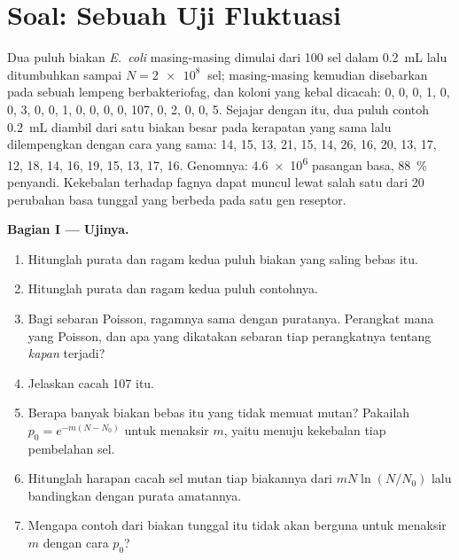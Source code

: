 \section{Soal: Sebuah Uji Fluktuasi}

\begin{problem}
\label{pb:b2:genome-diversification:1}
Dua puluh biakan \emph{E.~coli} masing-masing dimulai dari \num{100}
sel dalam \qty{0.2}{mL} lalu ditumbuhkan sampai $N = \qty{2e8}{}$ sel;
masing-masing kemudian disebarkan pada sebuah lempeng berbakteriofag,
dan koloni yang kebal dicacah: 0, 0, 0, 1, 0, 0, 3, 0, 0, 1, 0, 0, 0,
0, 107, 0, 2, 0, 0, 5. Sejajar dengan itu, dua puluh contoh
\qty{0.2}{mL} diambil dari satu biakan besar pada kerapatan yang sama
lalu dilempengkan dengan cara yang sama: 14, 15, 13, 21, 15, 14, 26,
16, 20, 13, 17, 12, 18, 14, 16, 19, 15, 13, 17, 16. Genomnya:
\qty{4.6e6}{} pasangan basa, \qty{88}{\%} penyandi. Kekebalan terhadap
fagnya dapat muncul lewat salah satu dari \num{20} perubahan basa
tunggal yang berbeda pada satu gen reseptor.

\medskip
\noindent\textbf{Bagian I --- Ujinya.}
\begin{enumerate}
  \item Hitunglah purata dan ragam kedua puluh biakan yang saling
        bebas itu.
  \item Hitunglah purata dan ragam kedua puluh contohnya.
  \item Bagi sebaran Poisson, ragamnya sama dengan puratanya.
        Perangkat mana yang Poisson, dan apa yang dikatakan sebaran
        tiap perangkatnya tentang \emph{kapan}  terjadi?
  \item Jelaskan cacah 107 itu.
  \item Berapa banyak biakan bebas itu yang tidak memuat mutan?
        Pakailah $p_0 = e^{-m(N - N_0)}$ untuk menaksir $m$, yaitu  menuju kekebalan tiap pembelahan sel.
  \item Hitunglah harapan cacah sel mutan tiap biakannya dari
        $mN\ln(N/N_0)$ lalu bandingkan dengan purata amatannya.
  \item Mengapa contoh dari biakan tunggal itu tidak akan berguna untuk
        menaksir $m$ dengan cara $p_0$?
\end{enumerate}


\end{problem}
